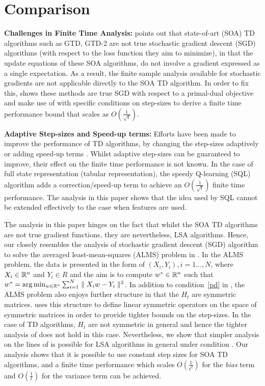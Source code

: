 \section{Comparison}
\textbf{Challenges in Finite Time Analysis:} \cite{} points out that state-of-art (SOA) TD algorithms such as GTD, GTD-2 are not true stochastic gradient descent (SGD) algorithms (with respect to the loss function they aim to minimize), in that the update equations of these SOA algorithms, do not involve a gradient expressed as a single expectation. As a result, the finite sample analysis available for stochastic gradients are not applicable directly to the SOA TD algorithm. In order to fix this, \cite{} shows these methods are true SGD with respect to a primal-dual objective and make use of \cite{} with specific conditions on step-sizes to derive a finite time performance bound that scales as $O(\frac{1}{\sqrt{t}})$.\par
\textbf{Adaptive Step-sizes and Speed-up terms:} Efforts have been made to improve the performance of TD algorithms, by changing the step-sizes adaptively \cite{} or adding speed-up terms \cite{}. Whilst adaptive step-sizes can be guaranteed to improve, their effect on the finite time performance is not known. In the case of full state representation (tabular representation), the speedy Q-learning (SQL) algorithm adds a correction/speed-up term to achieve an $O(\frac{1}{\sqrt{t}})$ finite time performance. The analysis in this paper shows that the idea used by SQL cannot be extended effectively to the case when features are used.\par
The analysis in this paper hinges on the fact that whilst the SOA TD algorithms are not true gradient functions, they are nevertheless, LSA algorithms. Hence, our closely resembles the analysis of stochastic gradient descent (SGD) algorithm to solve the averaged least-mean-squares (ALMS) problem in \cite{bachalms}. In the ALMS problem, the data is presented in the form of $(X_i,Y_i),i=1\ldots,N$, where $X_i\in \mathbb{R}^n$ and $Y_i\in R$ and the aim is to compute $w^*\in \mathbb{R}^n$ such that $w^*=\arg\min_{w\in \mathbb{R}^n}\sum_{i=1}^N\parallel X_iw-Y_i\parallel^2$. In addition to condition~\ref{pd} in , the ALMS problem also enjoys further structure in that the $H_t$ are symmetric matrices. \cite{} uses this structure to define linear symmetric operators on the space of symmetric matrices in order to provide tighter bounds on the step-sizes. In the case of TD algorithms, $H_t$ are not symmetric in general and hence the tighter analysis of \cite{} does not hold in this case. Nevertheless, we show that simpler analysis on the lines of \cite{} is possible for LSA algorithms in general under condition . Our analysis shows that it is possible to use constant step sizes for SOA TD algorithms, and a finite time performance which scales $O(\frac{1}{t^2})$ for the \emph{bias} term and $O(\frac{1}{t})$ for the variance term can be achieved.
